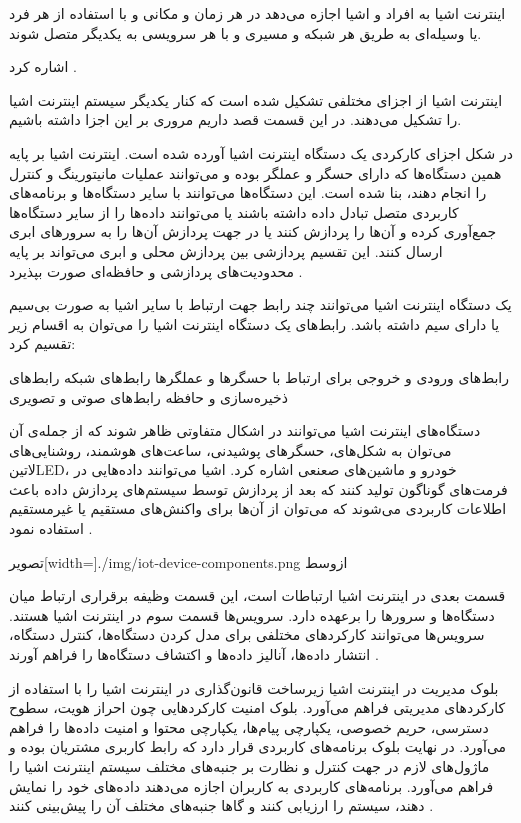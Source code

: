 اینترنت اشیا به افراد و اشیا اجازه می‌دهد در هر زمان و مکانی و با استفاده از هر فرد یا وسیله‌ای به طریق هر شبکه و مسیری و با هر سرویسی به یکدیگر متصل شوند.

اشاره کرد
 .

اینترنت اشیا از اجزای مختلفی تشکیل شده است که کنار یکدیگر سیستم اینترنت اشیا را تشکیل می‌دهند.
در این قسمت قصد داریم مروری بر این اجزا داشته باشیم.

در شکل  اجزای کارکردی یک دستگاه اینترنت اشیا آورده شده است.
اینترنت اشیا بر پایه همین دستگاه‌ها که دارای حسگر و عملگر بوده و می‌توانند عملیات مانیتورینگ و کنترل را انجام دهند، بنا شده است.
این دستگاه‌ها می‌توانند با سایر دستگاه‌ها و برنامه‌های کاربردی متصل تبادل داده داشته باشند یا می‌توانند داده‌ها را از سایر دستگاه‌ها جمع‌آوری کرده
و آن‌ها را پردازش کنند یا در جهت پردازش آن‌ها را به سرورهای ابری ارسال کنند. این تقسیم پردازشی بین پردازش محلی و ابری می‌تواند بر پایه محدودیت‌های پردازشی و حافظه‌ای
صورت بپذیرد
.

یک دستگاه اینترنت اشیا می‌توانند چند رابط جهت ارتباط با سایر اشیا به صورت بی‌سیم یا دارای سیم داشته باشد.
رابط‌های یک دستگاه اینترنت اشیا را می‌توان به اقسام زیر تقسیم کرد:

 رابط‌های ورودی و خروجی برای ارتباط با حسگرها و عملگرها
 رابط‌های شبکه
 رابط‌های ذخیره‌سازی و حافظه
 رابط‌های صوتی و تصویری

دستگاه‌های اینترنت اشیا می‌توانند در اشکال متفاوتی ظاهر شوند که از جمله‌ی آن می‌توان به شکل‌های، حسگرهای پوشیدنی، ساعت‌های هوشمند،
روشنایی‌های ‌لاتین{LED}، خودرو و ماشین‌های صعنعی اشاره کرد. اشیا می‌توانند داده‌هایی در فرمت‌های گوناگون تولید کنند که بعد از پردازش توسط سیستم‌های
پردازش داده باعث اطلاعات کاربردی می‌شوند که می‌توان از آن‌ها برای واکنش‌های مستقیم یا غیرمستقیم استفاده نمود
.

‌تصویر[width=\textwidth]{./img/iot-device-components.png}
‌ازوسط

قسمت بعدی در اینترنت اشیا ارتباطات است، این قسمت وظیفه برقراری ارتباط میان دستگاه‌ها و سرورها را برعهده دارد.
سرویس‌ها قسمت سوم در اینترنت اشیا هستند. سرویس‌ها می‌توانند کارکردهای مختلفی برای مدل کردن دستگاه‌ها، کنترل دستگاه،
انتشار داده‌ها، آنالیز داده‌ها و اکتشاف دستگاه‌ها را فراهم آورند
.

بلوک مدیریت در اینترنت اشیا زیرساخت قانون‌گذاری در اینترنت اشیا را با استفاده از کارکردهای مدیریتی فراهم می‌آورد.
بلوک امنیت کارکردهایی چون احراز هویت، سطوح دسترسی، حریم خصوصی، یکپارچی پیام‌ها، یکپارچی محتوا و امنیت داده‌ها را فراهم می‌آورد.
در نهایت بلوک برنامه‌های کاربردی قرار دارد که رابط کاربری مشتریان بوده و ماژول‌های لازم در جهت کنترل و نظارت بر جنبه‌های مختلف سیستم اینترنت اشیا
را فراهم می‌آورد. برنامه‌های کاربردی به کاربران اجازه می‌دهند داده‌های خود را نمایش دهند، سیستم را ارزیابی کنند و گاها جنبه‌های مختلف آن را پیش‌بینی کنند
.

